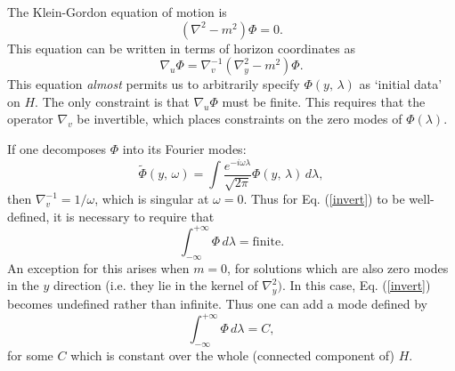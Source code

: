 \documentclass{article}
\begin{document}

The Klein-Gordon equation of motion is
\begin{equation}
(\nabla^2 - m^2)\Phi = 0.
\end{equation}
This equation can be written in terms of horizon coordinates as
\begin{equation}\label{invert}
\nabla_u \Phi = \nabla_v^{-1} (\nabla_y^2 - m^2)\Phi.
\end{equation}
This equation \emph{almost} permits us to arbitrarily specify $\Phi(y,\,\lambda)$ as `initial data' on $H$.  The only constraint is that $\nabla_u \Phi$ must be finite.  This requires that the operator $\nabla_v$ be invertible, which places constraints on the zero modes of $\Phi(\lambda)$.

If one decomposes $\Phi$ into its Fourier modes:
\begin{equation}\label{omega0}
\tilde{\Phi}(y,\,\omega) = \int
\frac{e^{-i\omega \lambda}}{\sqrt{2\pi}} \Phi(y,\,\lambda)\,d\lambda,
\end{equation}
then $\nabla_v^{-1} = 1/\omega$, which is singular at $\omega = 0$.  Thus for Eq. (\ref{invert}) to be well-defined, it is necessary to require that
\begin{equation}\label{zeromode}
\int_{-\infty}^{+\infty} \Phi\,d\lambda = \mathrm{finite}.
\end{equation}
An exception for this arises when $m = 0$, for solutions which are also zero modes in the $y$ direction (i.e. they lie in the kernel of $\nabla_y^2)$.  In this case, Eq. (\ref{invert}) becomes undefined rather than infinite.  Thus one can add a mode defined by
\begin{equation}\label{zero}
\int^{+\infty}_{-\infty} \Phi\,d\lambda = C,
\end{equation}
for some $C$ which is constant over the whole (connected component of) $H$.
\end{document}
